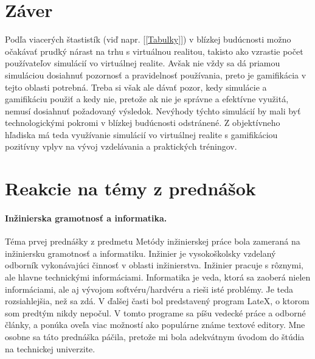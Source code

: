 \documentclass[10pt,slovak,a4paper]{article}
\begin{document}
\section{Záver} \label{Zaver}

Podľa viacerých štastistík (viď napr. [\ref{Tabulky}]) v blízkej budúcnosti možno očakávať prudký nárast na trhu s virtuálnou realitou, takisto ako vzrastie počet používateľov simulácií vo virtuálnej realite. Avšak nie vždy sa dá priamou simuláciou dosiahnuť pozornosť a pravidelnosť používania, preto je gamifikácia v tejto oblasti potrebná. Treba si však ale dávať pozor, kedy simulácie a gamifikáciu použiť a kedy nie, pretože ak nie je správne a efektívne využitá, nemusí dosiahnuť požadovaný výsledok. Nevýhody týchto simulácií by mali byť technologickými pokromi v blízkej budúcnosti odstránené. Z objektívneho hľadiska má teda využívanie simulácií vo virtuálnej realite s gamifikáciou pozitívny vplyv na vývoj vzdelávania a praktických tréningov.\newline \newline \newline


\section{Reakcie na témy z prednášok} \label{Reakcie.prednasky}
 
\paragraph{Inžinierska gramotnosť a informatika.} \label{Reakcia1}

Téma prvej prednášky z predmetu Metódy inžinierskej práce bola zameraná na inžiniersku gramotnosť a informatiku. Inžinier je vysokoškolsky vzdelaný odborník vykonávajúci činnosť v oblasti inžinierstva. Inžinier pracuje s rôznymi, ale hlavne technickými informáciami. Informatika je veda, ktorá sa zaoberá nielen informáciami, ale aj vývojom softvéru/hardvéru a rieši isté problémy. Je teda rozsiahlejšia, než sa zdá. V ďalšej časti bol predstavený program LateX, o ktorom som predtým nikdy nepočul. V tomto programe sa píšu vedecké práce a odborné články, a ponúka oveľa viac možností ako populárne známe textové editory. Mne osobne sa táto prednáška páčila, pretože mi bola adekvátnym úvodom do štúdia na technickej univerzite.
\end{document}
